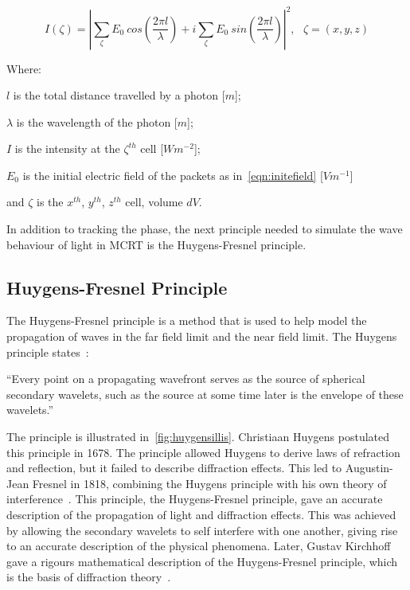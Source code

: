 \begin{equation}
I(\zeta)= \left| \sum\limits_{\zeta}E_0\ cos\left(\frac{2\pi l}{\lambda}\right) + i \sum\limits_{\zeta}E_0\ sin\left(\frac{2\pi l}{\lambda}\right)\right|^2,\ \ \ \zeta=(x,y,z)
\label{eqn:intense}
\end{equation}

\noindent Where:

\indent $l$ is the total distance travelled by a photon [$m$];

\indent $\lambda$ is the wavelength of the photon [$m$];

\indent $I$ is the intensity at the $\zeta^{th}$ cell [$W m^{-2}$];

\indent $E_0$ is the initial electric field of the packets as in~\cref{eqn:initefield} [$Vm^{-1}$]

\indent and $\zeta$ is the $x^{th}$, $y^{th}$, $z^{th}$ cell, volume $dV$.

\medskip

In addition to tracking the phase, the next principle needed to simulate the wave behaviour of light in MCRT is the Huygens-Fresnel principle.

\subsection{Huygens-Fresnel Principle}

The Huygens-Fresnel principle is a method that is used to help model the propagation of waves in the far field limit and the near field limit. 
The Huygens principle states~\cite{huygens2012treatise,hecht2017optics,huygens1900wave}: 

\medskip

``Every point on a propagating wavefront serves as the source of spherical secondary wavelets, such as the source at some time later is the envelope of these wavelets.''

\medskip

The principle is illustrated in~\cref{fig:huygensillis}. Christiaan Huygens postulated this principle in 1678.
The principle allowed Huygens to derive laws of refraction and reflection, but it failed to describe diffraction effects.
This led to Augustin-Jean Fresnel in 1818, combining the Huygens principle with his own theory of interference~\cite{fresnel1819memoire,huygens1900wave}.
This principle, the Huygens-Fresnel principle, gave an accurate description of the propagation of light and diffraction effects.
This was achieved by allowing the secondary wavelets to self interfere with one another, giving rise to an accurate description of the physical phenomena.
Later, Gustav Kirchhoff gave a rigours mathematical description of the Huygens-Fresnel principle, which is the basis of diffraction theory~\cite{kirchhoff1883ann,born2000principles}. 

